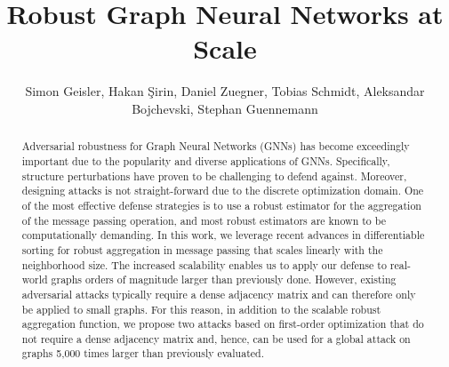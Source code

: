 \documentclass[sigconf,authordraft]{acmart}
\begin{document}
\title{Robust Graph Neural Networks at Scale}

\author{Simon Geisler, Hakan \c{S}irin, Daniel Zuegner, Tobias Schmidt, Aleksandar Bojchevski, Stephan Guennemann}

\renewcommand{\shortauthors}{Geisler et al.}

\begin{abstract}
  Adversarial robustness for Graph Neural Networks (GNNs) has become exceedingly important due to the popularity and diverse applications of GNNs. Specifically, structure perturbations have proven to be challenging to defend against. Moreover, designing attacks is not straight-forward due to the discrete optimization domain. One of the most effective defense strategies is to use a robust estimator for the aggregation of the message passing operation, and most robust estimators are known to be computationally demanding. In this work, we leverage recent advances in differentiable sorting for robust aggregation in message passing that scales linearly with the neighborhood size. The increased scalability enables us to apply our defense to real-world graphs orders of magnitude larger than previously done. However, existing adversarial attacks typically require a dense adjacency matrix and can therefore only be applied to small graphs. For this reason, in addition to the scalable robust aggregation function, we propose two attacks based on first-order optimization that do not require a dense adjacency matrix and, hence, can be used for a global attack on graphs 5,000 times larger than previously evaluated.
\end{abstract}
\end{document}
